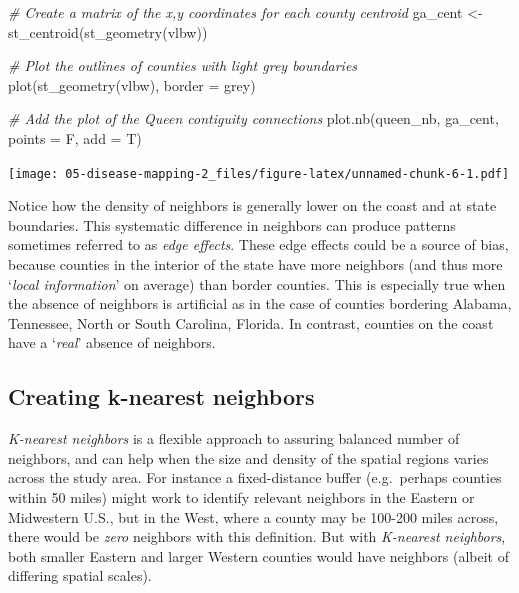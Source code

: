 \documentclass[
]{book}
\newenvironment{Shaded}{\begin{snugshade}}{\end{snugshade}}
\newcommand{\AttributeTok}[1]{\textcolor[rgb]{0.77,0.63,0.00}{#1}}
\newcommand{\CommentTok}[1]{\textcolor[rgb]{0.56,0.35,0.01}{\textit{#1}}}
\newcommand{\FunctionTok}[1]{\textcolor[rgb]{0.00,0.00,0.00}{#1}}
\newcommand{\NormalTok}[1]{#1}
\newcommand{\OtherTok}[1]{\textcolor[rgb]{0.56,0.35,0.01}{#1}}
\newcommand{\StringTok}[1]{\textcolor[rgb]{0.31,0.60,0.02}{#1}}
\begin{document}
\begin{Shaded}
\begin{Highlighting}[]
\CommentTok{\# Create a matrix of the x,y coordinates for each county centroid}
\NormalTok{ga\_cent }\OtherTok{\textless{}{-}} \FunctionTok{st\_centroid}\NormalTok{(}\FunctionTok{st\_geometry}\NormalTok{(vlbw))}

\CommentTok{\# Plot the outlines of counties with light grey boundaries}
\FunctionTok{plot}\NormalTok{(}\FunctionTok{st\_geometry}\NormalTok{(vlbw), }\AttributeTok{border =} \StringTok{\textquotesingle{}grey\textquotesingle{}}\NormalTok{)}

\CommentTok{\# Add the plot of the Queen contiguity connections}
\FunctionTok{plot.nb}\NormalTok{(queen\_nb, ga\_cent, }\AttributeTok{points =}\NormalTok{ F, }\AttributeTok{add =}\NormalTok{ T)}
\end{Highlighting}
\end{Shaded}

\texttt{[image: 05-disease-mapping-2\_files/figure-latex/unnamed-chunk-6-1.pdf]}

Notice how the density of neighbors is generally lower on the coast and at state boundaries. This systematic difference in neighbors can produce patterns sometimes referred to as \emph{edge effects}. These edge effects could be a source of bias, because counties in the interior of the state have more neighbors (and thus more `\emph{local information}' on average) than border counties. This is especially true when the absence of neighbors is artificial as in the case of counties bordering Alabama, Tennessee, North or South Carolina, Florida. In contrast, counties on the coast have a `\emph{real}' absence of neighbors.

\hypertarget{creating-k-nearest-neighbors}{%
\subsection{Creating k-nearest neighbors}\label{creating-k-nearest-neighbors}}

\emph{K-nearest neighbors} is a flexible approach to assuring balanced number of neighbors, and can help when the size and density of the spatial regions varies across the study area. For instance a fixed-distance buffer (e.g.~perhaps counties within 50 miles) might work to identify relevant neighbors in the Eastern or Midwestern U.S., but in the West, where a county may be 100-200 miles across, there would be \emph{zero} neighbors with this definition. But with \emph{K-nearest neighbors}, both smaller Eastern and larger Western counties would have neighbors (albeit of differing spatial scales).
\end{document}
